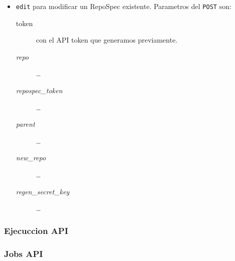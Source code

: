 \begin{itemize}
\begin{description}
    \end{description}
    \item \texttt{edit} para modificar un RepoSpec existente. Parametros del \texttt{POST} son:
    \begin{description}
    	\item[token] con el API token que generamos previamente.
        \item[\textit{repo}] \ldots
        \item[\textit{repospec\_token}] \ldots
        \item[\textit{parent}] \ldots
        \item[\textit{new\_repo}] \ldots
        \item[\textit{regen\_secret\_key}] \ldots
    \end{description}
\end{itemize}
\subsubsection{Ejecuccion API}
\subsubsection{Jobs API}


